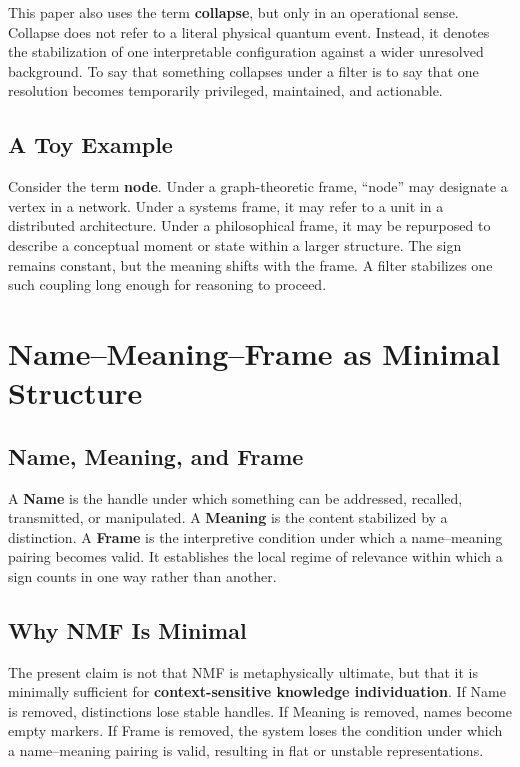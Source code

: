 \documentclass[11pt,a4paper]{article}
\newcommand{\term}[1]{\textbf{#1}}
\begin{document}
This paper also uses the term \term{collapse}, but only in an operational sense. Collapse does not refer to a literal physical quantum event. Instead, it denotes the stabilization of one interpretable configuration against a wider unresolved background. To say that something collapses under a filter is to say that one resolution becomes temporarily privileged, maintained, and actionable.

\subsection{A Toy Example}

Consider the term \term{node}. Under a graph-theoretic frame, ``node'' may designate a vertex in a network. Under a systems frame, it may refer to a unit in a distributed architecture. Under a philosophical frame, it may be repurposed to describe a conceptual moment or state within a larger structure. The sign remains constant, but the meaning shifts with the frame. A filter stabilizes one such coupling long enough for reasoning to proceed.

\section{Name--Meaning--Frame as Minimal Structure}

\subsection{Name, Meaning, and Frame}

A \term{Name} is the handle under which something can be addressed, recalled, transmitted, or manipulated. A \term{Meaning} is the content stabilized by a distinction. A \term{Frame} is the interpretive condition under which a name--meaning pairing becomes valid. It establishes the local regime of relevance within which a sign counts in one way rather than another.

\subsection{Why NMF Is Minimal}

The present claim is not that NMF is metaphysically ultimate, but that it is minimally sufficient for \textbf{context-sensitive knowledge individuation}. If Name is removed, distinctions lose stable handles. If Meaning is removed, names become empty markers. If Frame is removed, the system loses the condition under which a name--meaning pairing is valid, resulting in flat or unstable representations.
\end{document}
